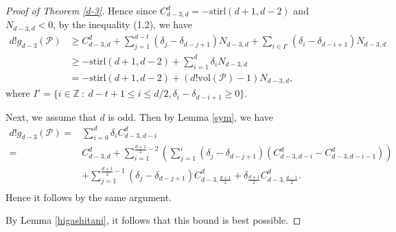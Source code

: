 \documentclass[12pt]{amsart}
\theoremstyle{definition}
\theoremstyle{remark}
\numberwithin{equation}{section}
\def\Pc{{\mathcal P}}
\def\NZQ{\mathbb}               %
\def\ZZ{{\NZQ Z}}
\begin{document}
\begin{proof}[Proof of Theorem \ref{d-3}]
Hence since $C_{d-3,d}^d=-\text{stirl}(d+1,d-2)$ and $N_{d-3,d}<0$, by the inequality (1.2), we have
\begin{displaymath}
\begin{aligned}
d!g_{d-3}(\Pc) & \geq C_{d-3,d}^d+\sum\limits_{j=1}^{d-t}(\delta_j-\delta_{d-j+1})N_{d-3,d}+\sum\limits_{i \in I'}(\delta_i-\delta_{d-i+1})N_{d-3,d}\\
& \geq -\text{stirl}(d+1,d-2)+\sum\limits_{i=1}^{d}\delta_iN_{d-3,d}\\
& = -\text{stirl}(d+1,d-2)+(d!\text{vol}(\Pc)-1)N_{d-3,d},
\end{aligned} 
\end{displaymath}
where $I'=\{i \in \ZZ \  : \  d-t+1 \leq i \leq d/2, \delta_i-\delta_{d-i+1} \geq 0 \}$.

Next, we assume that $d$ is odd.
Then by Lemma \ref{sym}, we have
\begin{displaymath}
\begin{aligned}
d!g_{d-3}(\Pc)=&\sum\limits_{i=0}^{d}\delta_iC_{d-3,d-i}^d\\
=&C_{d-3,d}^d+\sum\limits_{i=1}^{\frac{d+1}{2}-2}\left(\sum\limits_{j=1}^{i}(\delta_j-\delta_{d-j+1})(C_{d-3,d-i}^d-C_{d-3,d-i-1}^d)\right)\\
&+\sum\limits_{j=1}^{\frac{d+1}{2}-1}(\delta_j-\delta_{d-j+1})C_{d-3,\frac{d+1}{2}}^d+\delta_{\frac{d+1}{2}}C_{d-3,\frac{d-1}{2}}^d.\\
\end{aligned} 
\end{displaymath}
Hence it follows by the same argument.

By Lemma \ref{higashitani}, it follows that this bound is best possible.


\end{proof}
\end{document}
